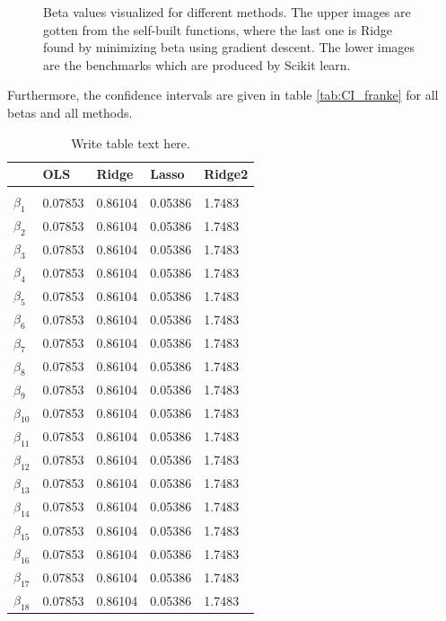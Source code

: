 \begin{figure} [H]
	\caption{Beta values visualized for different methods. The upper images are gotten from the self-built functions, where the last one is Ridge found by minimizing beta using gradient descent. The lower images are the benchmarks which are produced by Scikit learn.}%
	\label{fig:beta_plots}%
\end{figure}

Furthermore, the confidence intervals are given in table \eqref{tab:CI_franke} for all betas and all methods.

\begin{table} [H]
	\caption{Write table text here.  \vspace{2mm}}
	\begin{tabularx}{\textwidth}{l|XXXX} \hline\hline
		\label{tab:CI_franke}
		&\textbf{OLS}&\textbf{Ridge}&\textbf{Lasso}&\textbf{Ridge2}\\ \hline \\
		$\beta_1$ & 0.07853 & 0.86104 & 0.05386 & 1.7483\\
		$\beta_2$ & 0.07853 & 0.86104 & 0.05386 & 1.7483\\
		$\beta_3$ & 0.07853 & 0.86104 & 0.05386 & 1.7483\\
		$\beta_4$ & 0.07853 & 0.86104 & 0.05386 & 1.7483\\
		$\beta_5$ & 0.07853 & 0.86104 & 0.05386 & 1.7483\\
		$\beta_6$ & 0.07853 & 0.86104 & 0.05386 & 1.7483\\
		$\beta_7$ & 0.07853 & 0.86104 & 0.05386 & 1.7483\\
		$\beta_8$ & 0.07853 & 0.86104 & 0.05386 & 1.7483\\
		$\beta_9$ & 0.07853 & 0.86104 & 0.05386 & 1.7483\\
		$\beta_{10}$ & 0.07853 & 0.86104 & 0.05386 & 1.7483\\
		$\beta_{11}$ & 0.07853 & 0.86104 & 0.05386 & 1.7483\\
		$\beta_{12}$ & 0.07853 & 0.86104 & 0.05386 & 1.7483\\
		$\beta_{13}$ & 0.07853 & 0.86104 & 0.05386 & 1.7483\\
		$\beta_{14}$ & 0.07853 & 0.86104 & 0.05386 & 1.7483\\
		$\beta_{15}$ & 0.07853 & 0.86104 & 0.05386 & 1.7483\\
		$\beta_{16}$ & 0.07853 & 0.86104 & 0.05386 & 1.7483\\
		$\beta_{17}$ & 0.07853 & 0.86104 & 0.05386 & 1.7483\\
		$\beta_{18}$ & 0.07853 & 0.86104 & 0.05386 & 1.7483\\

\end{tabularx}
\end{table}
